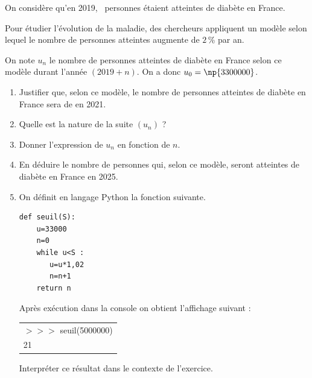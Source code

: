 \medskip

On considère qu'en 2019, ~personnes étaient atteintes de diabète en France.

Pour étudier l'évolution de la maladie, des chercheurs appliquent un modèle selon lequel le nombre de personnes atteintes augmente de $2$\,\% par an.

On note $u_n$ le nombre de personnes atteintes de diabète en France selon ce modèle durant l'année $(2019 + n)$. On a donc $u_0 = \np{3300000}$.

\medskip

\begin{enumerate}
\item Justifier que, selon ce modèle, le nombre de personnes atteintes de diabète en France sera de  en 2021.
\item Quelle est la nature de la suite $\left(u_n\right)$ ?
\item Donner l'expression de $u_n$ en fonction de $n$.
\item En déduire le nombre de personnes qui, selon ce modèle, seront atteintes de diabète en France en 2025.
\item On définit en langage Python la fonction suivante.

\begin{center}
\begin{lstlisting}[style=python]
def seuil(S): 
    u=33000
    n=0
    while u<S :
       u=u*1,02
       n=n+1
    return n
\end{lstlisting}
\end{center}

Après exécution dans la console on obtient l'affichage suivant :

\begin{center}
\begin{tabular}{|l|}\hline
$>>>$ seuil(5000000)\\
21\\ \hline
\end{tabular}
\end{center}

Interpréter ce résultat dans le contexte de l'exercice.
\end{enumerate}

\bigskip
